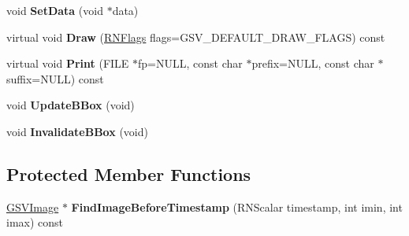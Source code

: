 \begin{DoxyCompactItemize}
\item 
void {\bfseries Set\+Data} (void $\ast$data)\hypertarget{class_g_s_v_tapestry_a984325c93e0f8ccb64ab39e75f8f04e1}{}\label{class_g_s_v_tapestry_a984325c93e0f8ccb64ab39e75f8f04e1}

\item 
virtual void {\bfseries Draw} (\hyperlink{class_r_n_flags}{R\+N\+Flags} flags=G\+S\+V\+\_\+\+D\+E\+F\+A\+U\+L\+T\+\_\+\+D\+R\+A\+W\+\_\+\+F\+L\+A\+GS) const \hypertarget{class_g_s_v_tapestry_a33fd276558fd45b687a334da9082b740}{}\label{class_g_s_v_tapestry_a33fd276558fd45b687a334da9082b740}

\item 
virtual void {\bfseries Print} (F\+I\+LE $\ast$fp=N\+U\+LL, const char $\ast$prefix=N\+U\+LL, const char $\ast$suffix=N\+U\+LL) const \hypertarget{class_g_s_v_tapestry_aa25332ff03364a5a0e45035f3edc713d}{}\label{class_g_s_v_tapestry_aa25332ff03364a5a0e45035f3edc713d}

\item 
void {\bfseries Update\+B\+Box} (void)\hypertarget{class_g_s_v_tapestry_ad8f1176689eefe23a46842665bbba6c7}{}\label{class_g_s_v_tapestry_ad8f1176689eefe23a46842665bbba6c7}

\item 
void {\bfseries Invalidate\+B\+Box} (void)\hypertarget{class_g_s_v_tapestry_a3c5410e515e4151cf9307eb2d3230bcf}{}\label{class_g_s_v_tapestry_a3c5410e515e4151cf9307eb2d3230bcf}

\end{DoxyCompactItemize}
\subsection*{Protected Member Functions}
\begin{DoxyCompactItemize}
\item 
\hyperlink{class_g_s_v_image}{G\+S\+V\+Image} $\ast$ {\bfseries Find\+Image\+Before\+Timestamp} (R\+N\+Scalar timestamp, int imin, int imax) const \hypertarget{class_g_s_v_tapestry_a668bf3dec42ee4d28fac95f4347fe8d1}{}\label{class_g_s_v_tapestry_a668bf3dec42ee4d28fac95f4347fe8d1}

\end{DoxyCompactItemize}
